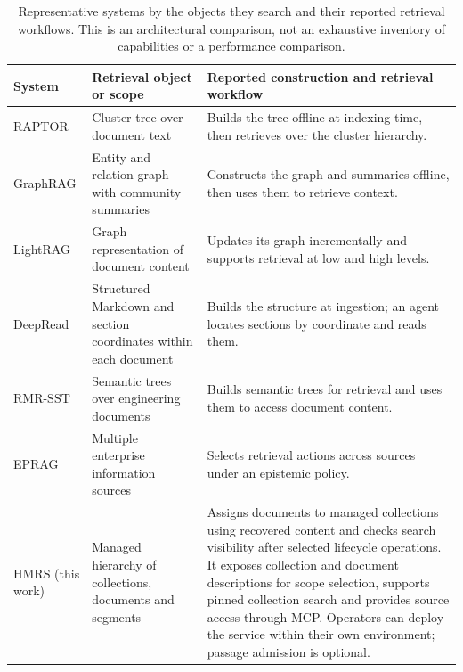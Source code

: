 \begin{table}[!t]
\centering
\small
\setlength{\tabcolsep}{4pt}
\renewcommand{\arraystretch}{1.08}
\caption{Representative systems by the objects they search and their reported
retrieval workflows. This is an architectural comparison, not an exhaustive
inventory of capabilities or a performance comparison.}
\label{tab:related-comparison}
\begin{tabular}{@{}>{\raggedright\arraybackslash}p{}>{\raggedright\arraybackslash}p{}>{\raggedright\arraybackslash}p{}@{}}
\toprule
System & Retrieval object or scope & Reported construction and retrieval workflow\\
\midrule
RAPTOR \citep{raptor} & Cluster tree over document text & Builds the tree offline at indexing time, then retrieves over the cluster hierarchy.\\
GraphRAG \citep{graphrag} & Entity and relation graph with community summaries & Constructs the graph and summaries offline, then uses them to retrieve context.\\
LightRAG \citep{lightrag} & Graph representation of document content & Updates its graph incrementally and supports retrieval at low and high levels.\\
DeepRead \citep{deepread} & Structured Markdown and section coordinates within each document & Builds the structure at ingestion; an agent locates sections by coordinate and reads them.\\
RMR-SST \citep{li-kbs-rmrsst-2026} & Semantic trees over engineering documents & Builds semantic trees for retrieval and uses them to access document content.\\
EPRAG \citep{kinalioglu-kbs-eprag-2026} & Multiple enterprise information sources & Selects retrieval actions across sources under an epistemic policy.\\
HMRS (this work) & Managed hierarchy of collections, documents and segments & Assigns documents to managed collections using recovered content and checks search visibility after selected lifecycle operations. It exposes collection and document descriptions for scope selection, supports pinned collection search and provides source access through MCP. Operators can deploy the service within their own environment; passage admission is optional.\\
\bottomrule
\end{tabular}
\end{table}

